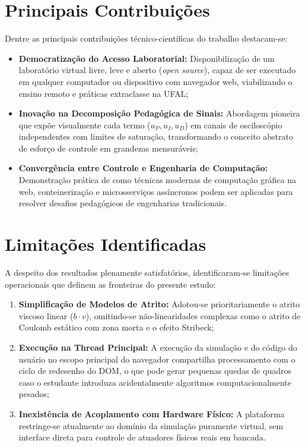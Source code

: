 \section{Principais Contribuições}
\label{sec:principais_contribuicoes}

Dentre as principais contribuições técnico-científicas do trabalho destacam-se:

\begin{itemize}
    \item \textbf{Democratização do Acesso Laboratorial:} Disponibilização de um laboratório virtual livre, leve e aberto (\textit{open source}), capaz de ser executado em qualquer computador ou dispositivo com navegador web, viabilizando o ensino remoto e práticas extraclasse na UFAL;
    \item \textbf{Inovação na Decomposição Pedagógica de Sinais:} Abordagem pioneira que expõe visualmente cada termo ($u_P, u_I, u_D$) em canais de osciloscópio independentes com limites de saturação, transformando o conceito abstrato de esforço de controle em grandezas mensuráveis;
    \item \textbf{Convergência entre Controle e Engenharia de Computação:} Demonstração prática de como técnicas modernas de computação gráfica na web, conteinerização e microsserviços assíncronos podem ser aplicadas para resolver desafios pedagógicos de engenharias tradicionais.
\end{itemize}

\section{Limitações Identificadas}
\label{sec:limitacoes}

A despeito dos resultados plenamente satisfatórios, identificaram-se limitações operacionais que definem as fronteiras do presente estudo:

\begin{enumerate}
    \item \textbf{Simplificação de Modelos de Atrito:} Adotou-se prioritariamente o atrito viscoso linear ($b \cdot v$), omitindo-se não-linearidades complexas como o atrito de Coulomb estático com zona morta e o efeito Stribeck;
    \item \textbf{Execução na Thread Principal:} A execução da simulação e do código do usuário no escopo principal do navegador compartilha processamento com o ciclo de redesenho do DOM, o que pode gerar pequenas quedas de quadros caso o estudante introduza acidentalmente algoritmos computacionalmente pesados;
    \item \textbf{Inexistência de Acoplamento com Hardware Físico:} A plataforma restringe-se atualmente ao domínio da simulação puramente virtual, sem interface direta para controle de atuadores físicos reais em bancada.
\end{enumerate}


